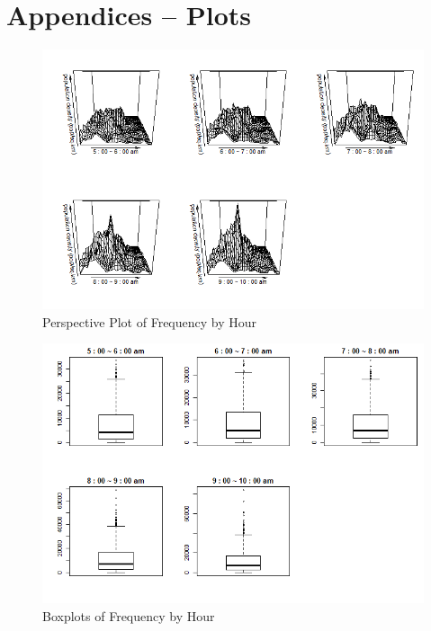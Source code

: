 \documentclass[hidelinks,12pt]{article}
\begin{document}
	\section{Appendices -- Plots} \label{sec:appa}
	\begin{figure}[!ht]
		\includegraphics[width=\textwidth]{persp.png}
		\caption{Perspective Plot of Frequency by Hour \label{fig:perp}}
	\end{figure}
\FloatBarrier
	\begin{figure}[!ht]
		\includegraphics[width=\textwidth]{box.png}
		\caption{Boxplots of Frequency by Hour \label{fig:boxplot}}
	\end{figure}
\FloatBarrier
\end{document}
